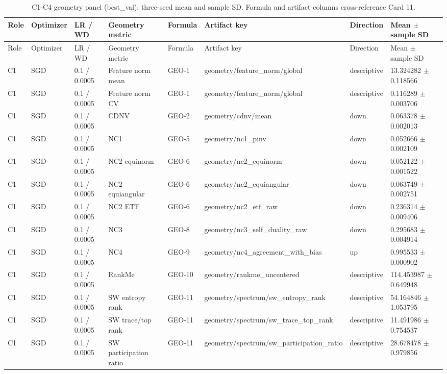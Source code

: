 \begin{longtable}{llllllll}
\caption{C1-C4 geometry panel (best\_val); three-seed mean and sample SD. Formula and artifact columns cross-reference Card 11.}\\
Role & Optimizer & LR / WD & Geometry metric & Formula & Artifact key & Direction & Mean $\pm$ sample SD \\
\hline
\endfirsthead
Role & Optimizer & LR / WD & Geometry metric & Formula & Artifact key & Direction & Mean $\pm$ sample SD \\
\hline
\endhead
C1 & SGD & 0.1 / 0.0005 & Feature norm mean & GEO-1 & geometry/feature\_norm/global & descriptive & 13.324282 $\pm$ 0.118566 \\
C1 & SGD & 0.1 / 0.0005 & Feature norm CV & GEO-1 & geometry/feature\_norm/global & descriptive & 0.116289 $\pm$ 0.003706 \\
C1 & SGD & 0.1 / 0.0005 & CDNV & GEO-2 & geometry/cdnv/mean & down & 0.063378 $\pm$ 0.002013 \\
C1 & SGD & 0.1 / 0.0005 & NC1 & GEO-5 & geometry/nc1\_pinv & down & 0.052666 $\pm$ 0.002109 \\
C1 & SGD & 0.1 / 0.0005 & NC2 equinorm & GEO-6 & geometry/nc2\_equinorm & down & 0.052122 $\pm$ 0.001522 \\
C1 & SGD & 0.1 / 0.0005 & NC2 equiangular & GEO-6 & geometry/nc2\_equiangular & down & 0.063749 $\pm$ 0.002751 \\
C1 & SGD & 0.1 / 0.0005 & NC2 ETF & GEO-6 & geometry/nc2\_etf\_raw & down & 0.236314 $\pm$ 0.009406 \\
C1 & SGD & 0.1 / 0.0005 & NC3 & GEO-8 & geometry/nc3\_self\_duality\_raw & down & 0.295683 $\pm$ 0.004914 \\
C1 & SGD & 0.1 / 0.0005 & NC4 & GEO-9 & geometry/nc4\_agreement\_with\_bias & up & 0.995533 $\pm$ 0.000902 \\
C1 & SGD & 0.1 / 0.0005 & RankMe & GEO-10 & geometry/rankme\_uncentered & descriptive & 114.453987 $\pm$ 0.649948 \\
C1 & SGD & 0.1 / 0.0005 & SW entropy rank & GEO-11 & geometry/spectrum/sw\_entropy\_rank & descriptive & 54.164846 $\pm$ 1.053795 \\
C1 & SGD & 0.1 / 0.0005 & SW trace/top rank & GEO-11 & geometry/spectrum/sw\_trace\_top\_rank & descriptive & 11.491986 $\pm$ 0.754537 \\
C1 & SGD & 0.1 / 0.0005 & SW participation ratio & GEO-11 & geometry/spectrum/sw\_participation\_ratio & descriptive & 28.678478 $\pm$ 0.979856 \\

\end{longtable}
